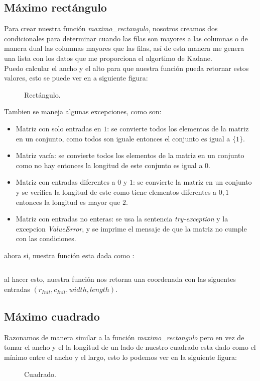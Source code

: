 \documentclass{article}
\begin{document}
{	\subsection*{Máximo rectángulo}
	Para crear nuestra función \textit{maximo\_rectangulo}, nosotros creamos dos condicionales para determinar cuando las filas son mayores a las columnas o de manera dual las columnas mayores que las filas, así de esta manera me genera una lista con los datos que me proporciona el algortimo de Kadane.\\
	Puedo calcular el ancho y el alto para que nuestra función pueda retornar estos valores, esto se puede ver en a siguiente figura:
	\begin{figure}[h]
		\centering 
		
		\caption{Rectángulo.}
	\end{figure}
	Tambien se maneja algunas excepciones, como son:
	\begin{itemize}
		\item Matriz con solo entradas en $1$: se convierte todos los elementos de la matriz en un conjunto, como todos son iguale entonces el conjunto es igual a $\{1\}$.
		\item Matriz vacía: se convierte todos los elementos de la matriz en un conjunto como no hay entonces la longitud de este conjunto es igual a $0$.
		\item Matriz con entradas diferentes a $0$ y $1$: se convierte la matriz en un conjunto y se verifica la longitud de este como tiene elementos diferentes a $0,1$ entonces la longitud es mayor que $2$.
		\item Matriz con entradas no enteras: se usa la sentencia \textit{try-exception} y la excepcion \textit{ValueError}, y se imprime el mensaje de que la matriz no cumple con las condiciones.
	\end{itemize}
	}
	ahora si, nuestra función esta dada como :
	\inputminted{python}{codigos/maximo_rectangulo.py}
	al hacer esto, nuestra función nos retorna una coordenada con las siguentes entradas $(r_{Init},c_{Init},width, length)$.
	\subsection*{Máximo cuadrado}
	Razonamos de manera similar a la función \textit{maximo\_rectangulo} pero en vez de tomar el ancho y el la longitud de un lado de nuestro cuadrado esta dado como el mínimo entre el ancho y el largo, esto lo podemos ver en la siguiente figura:
		\begin{figure}[h]
		\centering 
		
		\caption{Cuadrado.}
	\end{figure}
\end{document}
